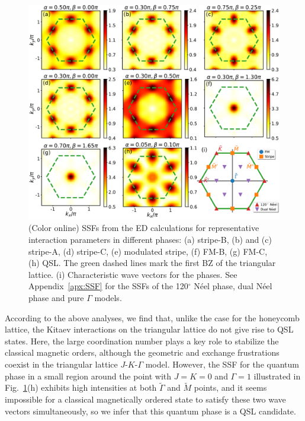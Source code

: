 \documentclass[aps,prb,reprint,amsfonts,amsmath,amssymb,showpacs,groupedaddress,superscriptaddress]{revtex4-1}
\begin{document}
\begin{figure}
    \centering
    \includegraphics[width=\columnwidth]{StructureFactors.pdf}
    \caption{\label{fig:StructureFactors}(Color online) SSFs from the ED calculations for representative interaction parameters in different phases: (a) stripe-B, (b) and (c) stripe-A, (d) stripe-C, (e) modulated stripe, (f) FM-B, (g) FM-C, (h) QSL. The green dashed lines mark the first BZ of the triangular lattice. (i) Characteristic wave vectors for the  phases. See Appendix~\ref{apx:SSF} for the SSFs of the 120$^\circ$ N\'{e}el phase, dual N\'{e}el phase and pure $\Gamma$ models.}
\end{figure}

According to the above analyses, we find that, unlike the case for the honeycomb lattice, the Kitaev interactions on the triangular lattice do not give rise to QSL states. Here, the large coordination number plays a key role to stabilize the classical magnetic orders, although the geometric and exchange frustrations coexist in the triangular lattice $J$-$K$-$\Gamma$ model. However, the SSF for the quantum phase in a small region around the point with $J=K=0$ and $\Gamma=1$ illustrated in Fig.~\ref{fig:StructureFactors}(h) exhibits high intensities at both $\tilde{\Gamma}$ and $\tilde{M}$ points, and it seems impossible for a classical magnetically ordered state to satisfy these two wave vectors simultaneously, so we infer that this quantum phase is a QSL candidate.
\end{document}
